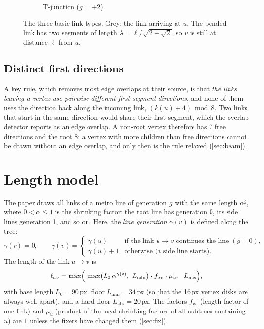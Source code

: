 \documentclass[11pt,a4paper]{article}
\newcommand{\len}{\ell}
\begin{document}
\begin{figure}[ht]
\begin{subfigure}[b]{0.28\textwidth}
\caption{T-junction ($g=+2$)}\end{subfigure}
\caption{The three basic link types. Grey: the link arriving at $u$. The bended link has two segments of length $\lambda=\len/\sqrt{2+\sqrt2}$, so $v$ is still at distance $\len$ from $u$.}
\label{fig:links}
\end{figure}

\subsection{Distinct first directions}

A key rule, which removes most edge overlaps at their source, is that \emph{the links leaving a vertex use pairwise different first-segment directions}, and none of them uses the direction back along the incoming link, $(k(u)+4)\bmod 8$. Two links that start in the same direction would share their first segment, which the overlap detector reports as an edge overlap. A non-root vertex therefore has 7 free directions and the root 8; a vertex with more children than free directions cannot be drawn without an edge overlap, and only then is the rule relaxed (\cref{sec:beam}).

\section{Length model}
\label{sec:length}

The paper draws all links of a metro line of generation $g$ with the same length $\alpha^g$, where $0<\alpha\le 1$ is the shrinking factor: the root line has generation 0, its side lines generation 1, and so on. Here, the \emph{line generation} $\gamma(v)$ is defined along the tree:
\[
  \gamma(r)=0,\qquad
  \gamma(v)=\begin{cases}\gamma(u) & \text{if the link } u\to v \text{ continues the line } (g=0),\\ \gamma(u)+1 & \text{otherwise (a side line starts).}\end{cases}
\]
The length of the link $u\to v$ is
\[
  \len_{uv} = \max\Bigl(\ \max\bigl(L_0\,\alpha^{\gamma(v)},\ L_{\min}\bigr)\cdot f_{uv}\cdot \mu_u,\ \ L_{\text{abs}}\Bigr),
\]
with base length $L_0=90$\,px, floor $L_{\min}=34$\,px (so that the 16\,px vertex disks are always well apart), and a hard floor $L_{\text{abs}}=20$\,px. The factors $f_{uv}$ (length factor of one link) and $\mu_u$ (product of the local shrinking factors of all subtrees containing $u$) are $1$ unless the fixers have changed them (\cref{sec:fix}).
\end{document}
